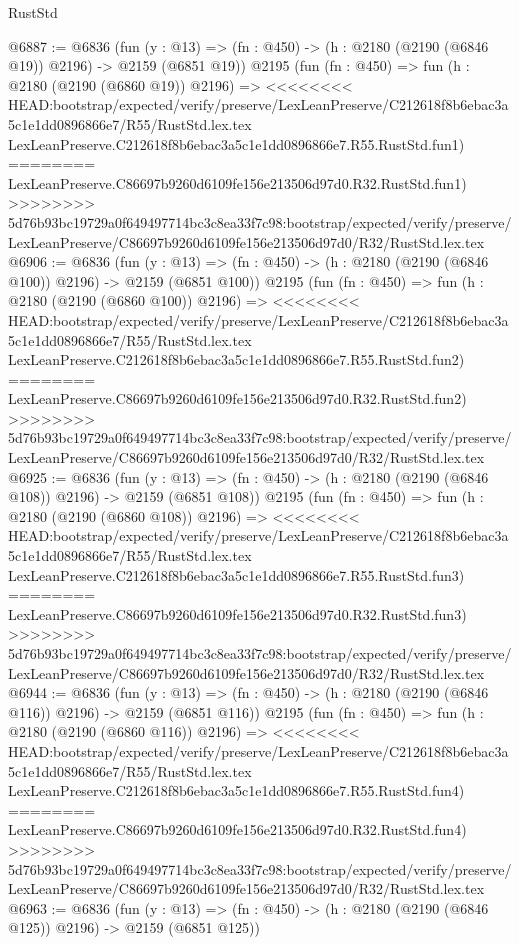 \begin{lexlean}{RustStd}
\begin{coremodule}
{\begin{coremodule}
{{{{{{{{{{@6887 := @6836
    (fun (y : @13) => (fn : @450) -> (h : @2180 (@2190 (@6846 @19)) @2196) -> @2159 (@6851 @19))
    @2195
    (fun (fn : @450) =>
    fun (h : @2180 (@2190 (@6860 @19)) @2196) =>
<<<<<<<< HEAD:bootstrap/expected/verify/preserve/LexLeanPreserve/C212618f8b6ebac3a5c1e1dd0896866e7/R55/RustStd.lex.tex
    LexLeanPreserve.C212618f8b6ebac3a5c1e1dd0896866e7.R55.RustStd.fun1)
========
    LexLeanPreserve.C86697b9260d6109fe156e213506d97d0.R32.RustStd.fun1)
>>>>>>>> 5d76b93bc19729a0f649497714bc3c8ea33f7c98:bootstrap/expected/verify/preserve/LexLeanPreserve/C86697b9260d6109fe156e213506d97d0/R32/RustStd.lex.tex
@6906 := @6836
    (fun (y : @13) => (fn : @450) -> (h : @2180 (@2190 (@6846 @100)) @2196) -> @2159 (@6851 @100))
    @2195
    (fun (fn : @450) =>
    fun (h : @2180 (@2190 (@6860 @100)) @2196) =>
<<<<<<<< HEAD:bootstrap/expected/verify/preserve/LexLeanPreserve/C212618f8b6ebac3a5c1e1dd0896866e7/R55/RustStd.lex.tex
    LexLeanPreserve.C212618f8b6ebac3a5c1e1dd0896866e7.R55.RustStd.fun2)
========
    LexLeanPreserve.C86697b9260d6109fe156e213506d97d0.R32.RustStd.fun2)
>>>>>>>> 5d76b93bc19729a0f649497714bc3c8ea33f7c98:bootstrap/expected/verify/preserve/LexLeanPreserve/C86697b9260d6109fe156e213506d97d0/R32/RustStd.lex.tex
@6925 := @6836
    (fun (y : @13) => (fn : @450) -> (h : @2180 (@2190 (@6846 @108)) @2196) -> @2159 (@6851 @108))
    @2195
    (fun (fn : @450) =>
    fun (h : @2180 (@2190 (@6860 @108)) @2196) =>
<<<<<<<< HEAD:bootstrap/expected/verify/preserve/LexLeanPreserve/C212618f8b6ebac3a5c1e1dd0896866e7/R55/RustStd.lex.tex
    LexLeanPreserve.C212618f8b6ebac3a5c1e1dd0896866e7.R55.RustStd.fun3)
========
    LexLeanPreserve.C86697b9260d6109fe156e213506d97d0.R32.RustStd.fun3)
>>>>>>>> 5d76b93bc19729a0f649497714bc3c8ea33f7c98:bootstrap/expected/verify/preserve/LexLeanPreserve/C86697b9260d6109fe156e213506d97d0/R32/RustStd.lex.tex
@6944 := @6836
    (fun (y : @13) => (fn : @450) -> (h : @2180 (@2190 (@6846 @116)) @2196) -> @2159 (@6851 @116))
    @2195
    (fun (fn : @450) =>
    fun (h : @2180 (@2190 (@6860 @116)) @2196) =>
<<<<<<<< HEAD:bootstrap/expected/verify/preserve/LexLeanPreserve/C212618f8b6ebac3a5c1e1dd0896866e7/R55/RustStd.lex.tex
    LexLeanPreserve.C212618f8b6ebac3a5c1e1dd0896866e7.R55.RustStd.fun4)
========
    LexLeanPreserve.C86697b9260d6109fe156e213506d97d0.R32.RustStd.fun4)
>>>>>>>> 5d76b93bc19729a0f649497714bc3c8ea33f7c98:bootstrap/expected/verify/preserve/LexLeanPreserve/C86697b9260d6109fe156e213506d97d0/R32/RustStd.lex.tex
@6963 := @6836
    (fun (y : @13) => (fn : @450) -> (h : @2180 (@2190 (@6846 @125)) @2196) -> @2159 (@6851 @125))
}}}}}}}}}}
\end{coremodule}}
\end{coremodule}
\end{lexlean}
